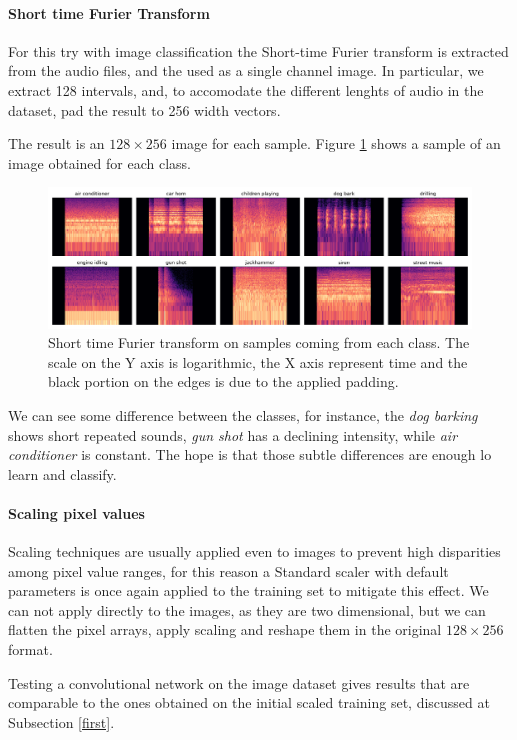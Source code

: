 \paragraph{Short time Furier Transform}
For this try with image classification the Short-time Furier transform 
is extracted from the audio files, and the used as a single channel image. 
In particular, we extract 128 intervals, and, to accomodate 
the different lenghts of audio in the dataset, pad the result to 256 width vectors.

The result is an $128 \times 256$ image for each sample. Figure \ref{img}
shows a sample of an image obtained for each class.

\begin{figure}
    \includegraphics[width=\textwidth]{images/class_images.png}  
    \caption{Short time Furier transform on samples coming from each class.
    The scale on the Y axis is logarithmic, the X axis represent time and 
    the black portion on the edges is due to the applied padding.}  
    \label{img}
\end{figure}

We can see some difference between the classes, for instance, the \emph{dog barking}
shows short repeated sounds, \emph{gun shot} has a declining intensity, while \emph{air conditioner}
is constant. The hope is that those subtle differences are enough lo learn and classify.

\paragraph{Scaling pixel values}
Scaling techniques  are usually applied even to images to prevent high disparities 
among pixel value ranges, for this reason a Standard scaler with default parameters is 
once again applied to the training set to mitigate this effect.
We can not apply directly to the images, as they are two dimensional, but we can 
flatten the pixel arrays, apply scaling and reshape them in the original $128 \times 256$ format.

Testing a convolutional network 
on the image dataset gives results that are comparable to the ones obtained on the initial scaled training 
set, discussed at Subsection \vref{first}.
\newpage